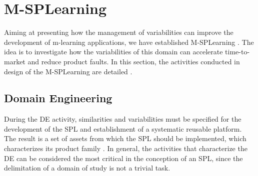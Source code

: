 \section{M-SPLearning}\label{section3}

Aiming at presenting how the management of variabilities can improve the development of m-learning applications, we have established M-SPLearning \cite{falvojr14a,falvojr14b}. The idea is to investigate how the variabilities of this domain can accelerate time-to-market and reduce product faults. In this section, the activities conducted in design of the M-SPLearning are detailed \cite{oliveirajr10,filho13,krueger02,kang90}.

\subsection{Domain Engineering}\label{section31}

During the DE activity, similarities and variabilities must be specified for the development of the SPL and establishment of a systematic reusable platform. The result is a set of assets from which the SPL should be implemented, which characterizes its product family \cite{bockle05,vanderlinden07}. In general, the activities that characterize the DE can be considered the most critical in the conception of an SPL, since the delimitation of a domain of study is not a trivial task.

